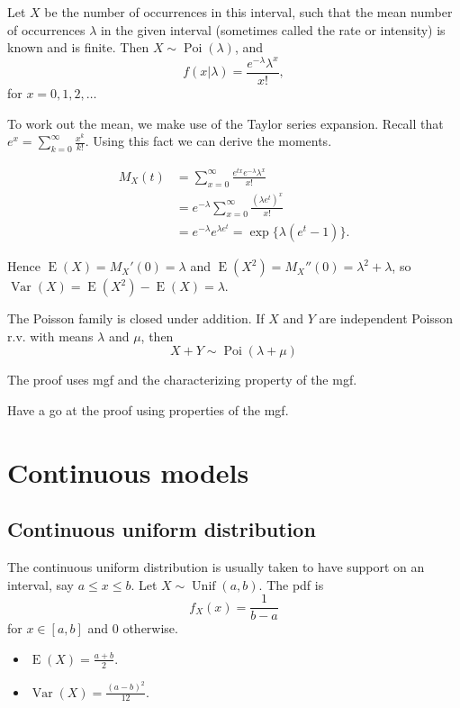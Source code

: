 \documentclass[
]{book}
\providecommand{\tightlist}{%
  \setlength{\itemsep}{0pt}\setlength{\parskip}{0pt}}
\DeclareMathOperator{\E}{E}
\DeclareMathOperator{\Var}{Var}
\DeclareMathOperator{\Pois}{Poi}
\DeclareMathOperator{\Unif}{Unif}
\theoremstyle{definition}
\theoremstyle{definition}
\theoremstyle{definition}
\theoremstyle{definition}
\theoremstyle{remark}
\begin{document}
Let \(X\) be the number of occurrences in this interval, such that the mean number of occurrences \(\lambda\) in the given interval (sometimes called the rate or intensity) is known and is finite. Then \(X\sim\Pois(\lambda)\), and
\[
f(x|\lambda) = \frac{e^{-\lambda}\lambda^x}{x!},
\]
for \(x=0,1,2,\dots\)

To work out the mean, we make use of the Taylor series expansion.
Recall that \(e^x=\sum_{k=0}^\infty \frac{x^k}{k!}\).
Using this fact we can derive the moments.

\begin{align*}
M_X(t)
&= \sum_{x=0}^\infty \frac{e^{tx} e^{-\lambda}\lambda^x}{x!} \\
&= e^{-\lambda} \sum_{x=0}^\infty \frac{(\lambda e^t)^x}{x!} \\
&= e^{-\lambda}e^{\lambda e^t} = \exp\{\lambda(e^t - 1) \}.
\end{align*}

Hence \(\E(X)=M_X'(0)=\lambda\) and \(\E(X^2)=M_X''(0)=\lambda^2+\lambda\), so \(\Var(X)=\E(X^2)-\E(X)=\lambda\).

The Poisson family is closed under addition.
If \(X\) and \(Y\) are independent Poisson r.v. with means \(\lambda\) and \(\mu\), then
\[
X+Y \sim \Pois(\lambda + \mu)
\]

The proof uses mgf and the characterizing property of the mgf.

Have a go at the proof using properties of the mgf.

\hypertarget{continuous-models}{%
\section{Continuous models}\label{continuous-models}}

\hypertarget{continuous-uniform-distribution}{%
\subsection{Continuous uniform distribution}\label{continuous-uniform-distribution}}

The continuous uniform distribution is usually taken to have support on an interval, say \(a \leq x \leq b\). Let \(X\sim\Unif(a,b)\). The pdf is
\[
  f_X(x) = \frac{1}{b-a}
\]
for \(x\in[a,b]\) and 0 otherwise.

\begin{itemize}
\tightlist
\item
  \(\E(X)=\frac{a+b}{2}\).
\item
  \(\Var(X)=\frac{(a-b)^2}{12}\).
\end{itemize}
\end{document}
